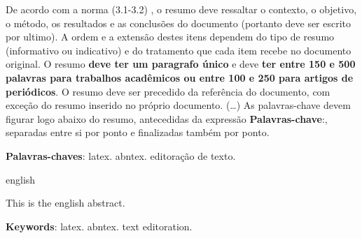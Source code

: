 
\setlength{\absparsep}{18pt} %
\begin{resumo}

 De acordo com a norma  (3.1-3.2) , o resumo deve ressaltar o contexto, o objetivo, o método, os resultados e as conclusões do documento (portanto deve ser escrito por ultimo). A ordem e a extensão destes itens dependem do tipo de resumo (informativo ou indicativo) e do  tratamento que cada item recebe no documento original. O resumo \textbf{deve ter um paragrafo único} e deve \textbf{ter entre 150 e 500 palavras para trabalhos acadêmicos ou entre 100 e 250 para artigos de periódicos}. O resumo deve ser  precedido da referência do documento, com exceção do resumo inserido no  próprio documento. (\ldots) As palavras-chave devem figurar logo abaixo do resumo, antecedidas da expressão \textbf{Palavras-chave}:, separadas entre si por ponto e finalizadas também por ponto.

 \textbf{Palavras-chaves}: latex. abntex. editoração de texto.
\end{resumo}

\begin{resumo}[Abstract]
 \begin{otherlanguage*}{english}

   This is the english abstract.



   \vspace{\onelineskip}

   \noindent 
   \textbf{Keywords}: latex. abntex. text editoration.
 \end{otherlanguage*}
\end{resumo}